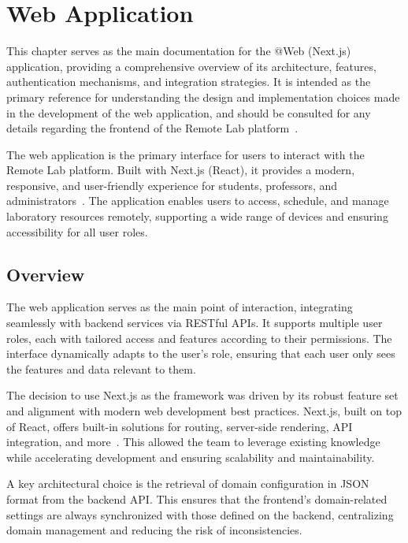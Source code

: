 \chapter{Web Application} \label{cap:web_app}

This chapter serves as the main documentation for the @Web (Next.js) application, providing a comprehensive overview of its architecture, features, authentication mechanisms, and integration strategies. It is intended as the primary reference for understanding the design and implementation choices made in the development of the web application, and should be consulted for any details regarding the frontend of the Remote Lab platform~\cite{nextjs-docs}.

The web application is the primary interface for users to interact with the Remote Lab platform. Built with Next.js (React), it provides a modern, responsive, and user-friendly experience for students, professors, and administrators~\cite{nextjs-docs}. The application enables users to access, schedule, and manage laboratory resources remotely, supporting a wide range of devices and ensuring accessibility for all user roles.

\section{Overview}
The web application serves as the main point of interaction, integrating seamlessly with backend services via RESTful APIs. It supports multiple user roles, each with tailored access and features according to their permissions. The interface dynamically adapts to the user's role, ensuring that each user only sees the features and data relevant to them.

The decision to use Next.js as the framework was driven by its robust feature set and alignment with modern web development best practices. Next.js, built on top of React, offers built-in solutions for routing, server-side rendering, API integration, and more~\cite{nextjs-app-router,nextjs-server-client-components,nextjs-data-fetching,nextjs-api-routes}. This allowed the team to leverage existing knowledge while accelerating development and ensuring scalability and maintainability.

A key architectural choice is the retrieval of domain configuration in JSON format from the backend API. This ensures that the frontend's domain-related settings are always synchronized with those defined on the backend, centralizing domain management and reducing the risk of inconsistencies.

